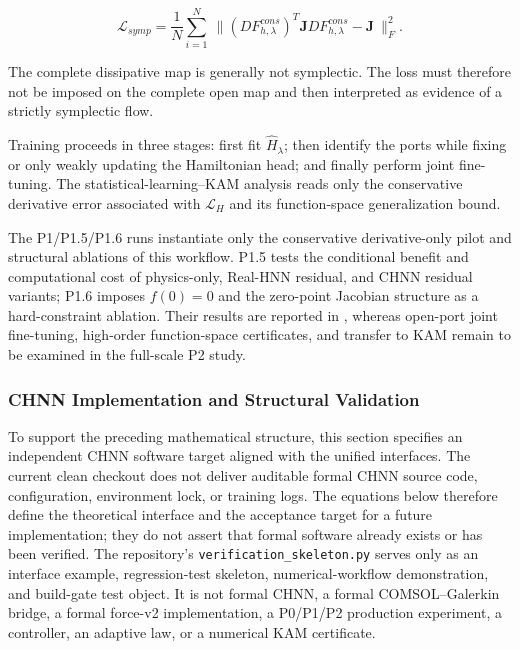 \begin{equation}
\label{eq:chnn-4-30}
\mathcal{L}_{symp} = \frac{1}{N}\sum_{i = 1}^{N}\left. \  \parallel \left( DF_{h,\lambda}^{cons} \right)^{T}\mathbf{J}DF_{h,\lambda}^{cons} - \mathbf{J} \right.\  \parallel_{F}^{2}.
\end{equation}

The complete dissipative map is generally not symplectic. The loss must therefore not be imposed on the complete open map and then interpreted as evidence of a strictly symplectic flow.

Training proceeds in three stages: first fit \({\widehat{H}}_{\lambda}\); then identify the ports while fixing or only weakly updating the Hamiltonian head; and finally perform joint fine-tuning. The statistical-learning--KAM analysis reads only the conservative derivative error associated with \(\mathcal{L}_{H}\) and its function-space generalization bound.

The P1/P1.5/P1.6 runs instantiate only the conservative derivative-only pilot and structural ablations of this workflow. P1.5 tests the conditional benefit and computational cost of physics-only, Real-HNN residual, and CHNN residual variants; P1.6 imposes \(f(0)=0\) and the zero-point Jacobian structure as a hard-constraint ablation. Their results are reported in , whereas open-port joint fine-tuning, high-order function-space certificates, and transfer to KAM remain to be examined in the full-scale P2 study.

\subsubsection{CHNN Implementation and Structural Validation}\label{sec:chnn-4-5-4}

To support the preceding mathematical structure, this section specifies an independent CHNN software target aligned with the unified interfaces. The current clean checkout does not deliver auditable formal CHNN source code, configuration, environment lock, or training logs. The equations below therefore define the theoretical interface and the acceptance target for a future implementation; they do not assert that formal software already exists or has been verified. The repository's \texttt{verification\_skeleton.py} serves only as an interface example, regression-test skeleton, numerical-workflow demonstration, and build-gate test object. It is not formal CHNN, a formal COMSOL--Galerkin bridge, a formal force-v2 implementation, a P0/P1/P2 production experiment, a controller, an adaptive law, or a numerical KAM certificate.


